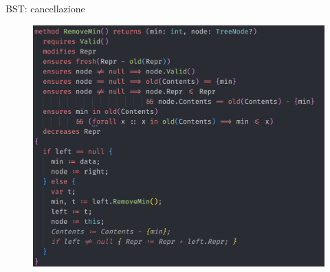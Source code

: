 \documentclass{beamer}
\begin{document}
\begin{frame}{BST: cancellazione}
{\begin{figure}
            \includegraphics[scale=0.4]{./assets/images/screenshots/remove_3.png}
        \end{figure}
    }
\end{frame}
\end{document}
